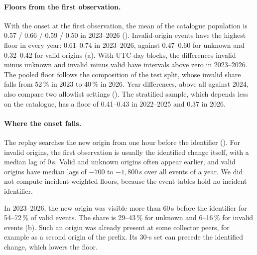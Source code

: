 \paragraph{Floors from the first observation.}
With the onset at the first observation, the mean \floor of the catalogue population is 0.57 / 0.66 / 0.59 / 0.50 in 2023--2026 ().
Invalid-origin events have the highest floor in every year: 0.61--0.74 in 2023--2026, against 0.47--0.60 for unknown and 0.32--0.42 for valid origins (a).
With UTC-day blocks, the differences invalid minus unknown and invalid minus valid have intervals above zero in 2023--2026.
The pooled floor follows the composition of the test split, whose invalid share falls from 52\,\% in 2023 to 40\,\% in 2026.
Year differences, above all against 2024, also compare two allowlist settings ().
The stratified sample, which depends less on the catalogue, has a floor of 0.41--0.43 in 2022--2025 and 0.37 in 2026.

\paragraph{Where the onset falls.}
The replay searches the new origin from one hour before the identifier ().
For invalid origins, the first observation is usually the identified change itself, with a median lag of 0\,s.
Valid and unknown origins often appear earlier, and valid origins have median lags of $-700$ to $-1{,}800$\,s over all events of a year.
We did not compute incident-weighted floors, because the event tables hold no incident identifier.

In 2023--2026, the new origin was visible more than 60\,s before the identifier for 54--72\,\% of valid events.
The share is 29--43\,\% for unknown and 6--16\,\% for invalid events (b).
Such an origin was already present at some collector peers, for example as a second origin of the prefix.
Its 30-s set can precede the identified change, which lowers the floor.


